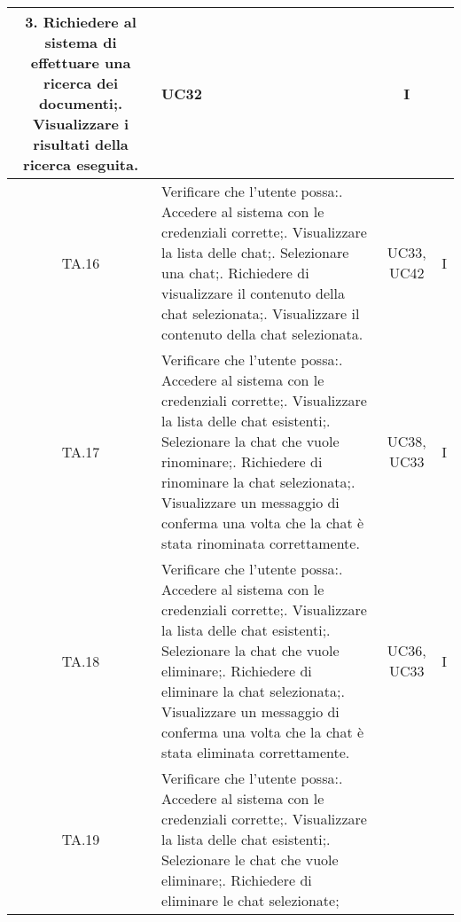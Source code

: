 {{{{{{{{\begin{xltabular}{\textwidth}{|c|X|c|c|}
    3. Richiedere al sistema di effettuare una ricerca dei documenti;. Visualizzare i risultati della ricerca eseguita. & UC32 & I \\
    \hline
    TA.16 & Verificare che l'utente possa:. Accedere al sistema con le credenziali corrette;. Visualizzare la lista delle chat;. Selezionare una chat;. Richiedere di visualizzare il contenuto della chat selezionata;. Visualizzare il contenuto della chat selezionata. & UC33, UC42 & I \\
    \hline
    TA.17 & Verificare che l'utente possa:. Accedere al sistema con le credenziali corrette;. Visualizzare la lista delle chat esistenti;. Selezionare la chat che vuole rinominare;. Richiedere di rinominare la chat selezionata;. Visualizzare un messaggio di conferma una volta che la chat è stata rinominata correttamente. & UC38, UC33 & I \\
    \hline
    TA.18 & Verificare che l'utente possa:. Accedere al sistema con le credenziali corrette;. Visualizzare la lista delle chat esistenti;. Selezionare la chat che vuole eliminare;. Richiedere di eliminare la chat selezionata;. Visualizzare un messaggio di conferma una volta che la chat è stata eliminata correttamente. & UC36, UC33 & I \\
    \hline
    TA.19 & Verificare che l'utente possa:. Accedere al sistema con le credenziali corrette;. Visualizzare la lista delle chat esistenti;. Selezionare le chat che vuole eliminare;. Richiedere di eliminare le chat selezionate;\newline

\end{xltabular}}}}}}}}}
